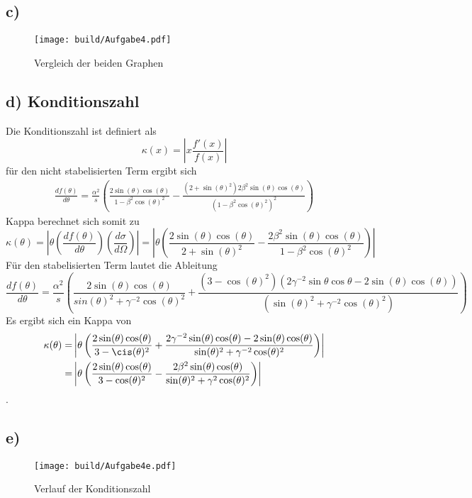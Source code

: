 \subsection*{c)}
\begin{figure}
  \centering
  \texttt{[image: build/Aufgabe4.pdf]}
  \caption{Vergleich der beiden Graphen}
  \label{fig:Vergleich der beiden Graphen}
\end{figure}
\subsection*{d) Konditionszahl}
Die Konditionszahl ist definiert als 
\begin{equation}
  \kappa(x) = \left| x\frac{f'(x)}{f(x)} \right|
  \label{}
\end{equation}
für den nicht stabelisierten Term ergibt sich 
\begin{eqnarray}
  \frac{df(\theta)}{d\theta} = \frac{\alpha^2}{s} \left( \frac{2\sin(\theta)\cos(\theta)}{1 - \beta^2 \cos(\theta)^2} - \frac{(2+\sin(\theta)^2)2\beta^2\sin(\theta)\cos(\theta)}{(1-\beta^2\cos(\theta)^2)^2} \right)
  \label{}
\end{eqnarray}
Kappa berechnet sich somit zu 
\begin{equation}
  \kappa(\theta) = \left| \theta \left( \frac{df(\theta)}{d\theta} \right) \left( \frac{d\sigma}{d\Omega} \right) \right| = \left| \theta \left( \frac{2\sin(\theta)\cos(\theta)}{2 + \sin(\theta)^2} - \frac{2\beta^2\sin(\theta)\cos(\theta)}{1 - \beta^2 \cos(\theta)^2} \right) \right|
  \label{}
\end{equation}
Für den stabelisierten Term lautet die Ableitung
\begin{equation}
  \frac{df(\theta)}{d\theta} = \frac{\alpha^2}{s}\left( \frac{2\sin(\theta)\cos(\theta)}{sin(\theta)^2+\gamma^{-2}\cos(\theta)^2} + \frac{(3-\cos(\theta)^2)(2\gamma^{-2}\sin{\theta}\cos{\theta}-2\sin(\theta)\cos(\theta))}{(\sin(\theta)^2 + \gamma^{-2}\cos(\theta)^2)} \right)
  \label{<++>}
\end{equation}
Es ergibt sich ein Kappa von 
\begin{eqnarray}
  \kappa(\theta) =& \left| \theta \left( \frac{2\sin(\theta)\cos(\theta)}{3 - \cis(\theta)^2} + \frac{2\gamma^{-2}\sin(\theta)\cos(\theta) - 2\sin(\theta)\cos(\theta)}{\sin(\theta)^2 + \gamma^{-2}\cos(\theta)^2}  \right) \right| \\
  =& \left| \theta \left( \frac{2\sin(\theta)\cos(\theta)}{3 - \cos(\theta)^2} - \frac{2\beta^2\sin(\theta)\cos(\theta)}{\sin(\theta)^2 + \gamma^2 \cos(\theta)^2} \right) \right|
\end{eqnarray}.
\subsection*{e)}
\begin{figure}
  \centering
  \texttt{[image: build/Aufgabe4e.pdf]}
  \caption{Verlauf der Konditionszahl}
  \label{fig:<+label+>}
\end{figure}
